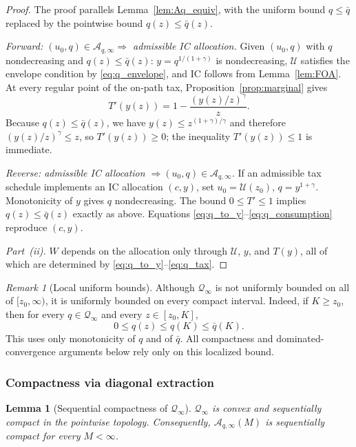 \documentclass[12pt,a4paper]{article}
\theoremstyle{definition}
\theoremstyle{plain}
\newtheorem{lemma}{Lemma}[section]
\theoremstyle{remark}
\newtheorem{remark}{Remark}[section]
\newcommand{\zlow}{z_{\scriptscriptstyle 0}}
\newcommand{\calU}{\mathcal{U}}
\begin{document}
\begin{proof}
The proof parallels Lemma~\ref{lem:Aq_equiv}, with the
uniform bound $q \leq \bar q$ replaced by the pointwise
bound $q(z) \leq \bar q(z)$.

\emph{Forward: $(u_0, q) \in \mathcal{A}_{q,\infty}
\Rightarrow$ admissible IC allocation.}
Given $(u_0,q)$ with $q$ nondecreasing and
$q(z) \leq \bar q(z)$:
$y = q^{1/(1+\gamma)}$ is nondecreasing, $\calU$ satisfies the
envelope condition by \eqref{eq:q_envelope}, and IC follows from
Lemma~\ref{lem:FOA}.  At every regular point of the on-path tax,
Proposition~\ref{prop:marginal} gives
\[
  T'(y(z)) = 1 - \frac{(y(z)/z)^\gamma}{z}.
\]
Because $q(z) \leq \bar q(z)$, we have
$y(z) \leq z^{(1+\gamma)/\gamma}$ and therefore
$(y(z)/z)^\gamma \leq z$, so $T'(y(z)) \geq 0$; the inequality
$T'(y(z)) \leq 1$ is immediate.

\emph{Reverse: admissible IC allocation $\Rightarrow
(u_0, q) \in \mathcal{A}_{q,\infty}$.}
If an admissible tax schedule implements an IC allocation
$(c,y)$, set $u_0 = \calU(\zlow)$, $q = y^{1+\gamma}$.
Monotonicity of $y$ gives $q$ nondecreasing.  The bound
$0 \leq T' \leq 1$ implies
$q(z) \leq \bar q(z)$ exactly as above.
Equations \eqref{eq:q_to_y}--\eqref{eq:q_consumption}
reproduce $(c,y)$.

\emph{Part~(ii).}
$W$ depends on the allocation only through $\calU$, $y$, and
$T(y)$, all of which are determined by
\eqref{eq:q_to_y}--\eqref{eq:q_tax}.
\end{proof}

\begin{remark}[Local uniform bounds]
\label{rem:local_bounds_unbounded}
Although $\mathcal{Q}_\infty$ is not uniformly bounded on all of
$[\zlow,\infty)$, it is uniformly bounded on every compact interval.
Indeed, if $K \geq \zlow$, then for every $q \in \mathcal{Q}_\infty$
and every $z \in [\zlow,K]$,
\[
  0 \leq q(z) \leq q(K) \leq \bar q(K).
\]
This uses only monotonicity of $q$ and of $\bar q$.
All compactness and dominated-convergence arguments below rely only on
this localized bound.
\end{remark}


\subsubsection{Compactness via diagonal extraction}

\begin{lemma}[Sequential compactness of $\mathcal{Q}_\infty$]
\label{lem:Aq_compact_unbounded}
$\mathcal{Q}_\infty$ is convex and sequentially compact in the
pointwise topology.  Consequently,
$\mathcal{A}_{q,\infty}(M)$ is sequentially compact for every
$M < \infty$.
\end{lemma}
\end{document}
